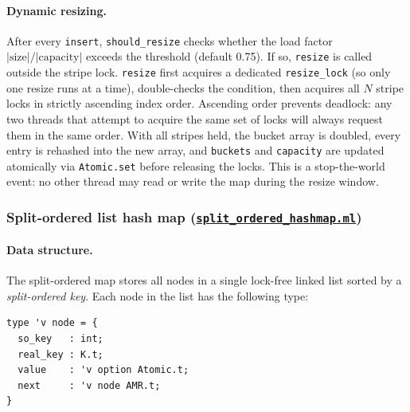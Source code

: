 \documentclass[11pt,a4paper]{article}
\begin{document}
\paragraph{Dynamic resizing.}
After every \texttt{insert}, \texttt{should\_resize} checks whether the load
factor $\lvert\text{size}\rvert / \lvert\text{capacity}\rvert$ exceeds the
threshold (default 0.75). If so, \texttt{resize} is called outside the stripe
lock. \texttt{resize} first acquires a dedicated \texttt{resize\_lock} (so only
one resize runs at a time), double-checks the condition, then acquires all $N$
stripe locks in strictly ascending index order. Ascending order prevents
deadlock: any two threads that attempt to acquire the same set of locks will
always request them in the same order. With all stripes held, the bucket array
is doubled, every entry is rehashed into the new array, and \texttt{buckets}
and \texttt{capacity} are updated atomically via \texttt{Atomic.set} before
releasing the locks. This is a stop-the-world event: no other thread may
read or write the map during the resize window.

\subsubsection{Split-ordered list hash map (\href{https://github.com/ogirala-srihasa/Concurrent-Hashmap/blob/main/lib/split_ordered_hashmap.ml}{\texttt{split\_ordered\_hashmap.ml}})}

\paragraph{Data structure.}
The split-ordered map stores all nodes in a single lock-free linked list sorted
by a \emph{split-ordered key}. Each node in the list has the following type:

\begin{verbatim}
type 'v node = {
  so_key   : int;
  real_key : K.t;
  value    : 'v option Atomic.t;
  next     : 'v node AMR.t;
}
\end{verbatim}
\end{document}

